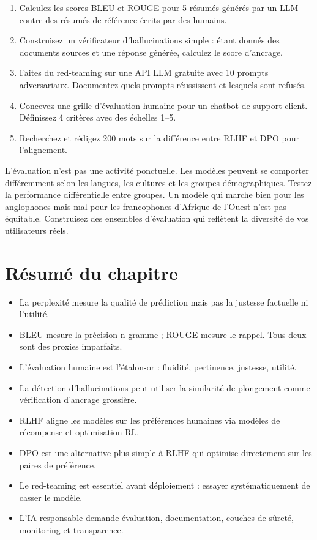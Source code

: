 \begin{exercise}
\begin{enumerate}
  \item Calculez les scores BLEU et ROUGE pour 5 r\'esum\'es g\'en\'er\'es par un LLM contre des r\'esum\'es de r\'ef\'erence \'ecrits par des humains.
  \item Construisez un v\'erificateur d'hallucinations simple : \'etant donn\'es des documents sources et une r\'eponse g\'en\'er\'ee, calculez le score d'ancrage.
  \item Faites du red-teaming sur une API LLM gratuite avec 10 prompts adversariaux. Documentez quels prompts r\'eussissent et lesquels sont refus\'es.
  \item Concevez une grille d'\'evaluation humaine pour un chatbot de support client. D\'efinissez 4 crit\`eres avec des \'echelles 1--5.
  \item Recherchez et r\'edigez 200 mots sur la diff\'erence entre RLHF et DPO pour l'alignement.
\end{enumerate}
\end{exercise}

\begin{ethicsbox}
L'\'evaluation n'est pas une activit\'e ponctuelle. Les mod\`eles peuvent se comporter diff\'eremment selon les langues, les cultures et les groupes d\'emographiques. Testez la performance diff\'erentielle entre groupes. Un mod\`ele qui marche bien pour les anglophones mais mal pour les francophones d'Afrique de l'Ouest n'est pas \'equitable. Construisez des ensembles d'\'evaluation qui refl\`etent la diversit\'e de vos utilisateurs r\'eels.
\end{ethicsbox}

\section{R\'esum\'e du chapitre}

\begin{itemize}
  \item La perplexit\'e mesure la qualit\'e de pr\'ediction mais pas la justesse factuelle ni l'utilit\'e.
  \item BLEU mesure la pr\'ecision n-gramme ; ROUGE mesure le rappel. Tous deux sont des proxies imparfaits.
  \item L'\'evaluation humaine est l'\'etalon-or : fluidit\'e, pertinence, justesse, utilit\'e.
  \item La d\'etection d'hallucinations peut utiliser la similarit\'e de plongement comme v\'erification d'ancrage grossi\`ere.
  \item RLHF aligne les mod\`eles sur les pr\'ef\'erences humaines via mod\`eles de r\'ecompense et optimisation RL.
  \item DPO est une alternative plus simple \`a RLHF qui optimise directement sur les paires de pr\'ef\'erence.
  \item Le red-teaming est essentiel avant d\'eploiement : essayer syst\'ematiquement de casser le mod\`ele.
  \item L'IA responsable demande \'evaluation, documentation, couches de s\^uret\'e, monitoring et transparence.
\end{itemize}
